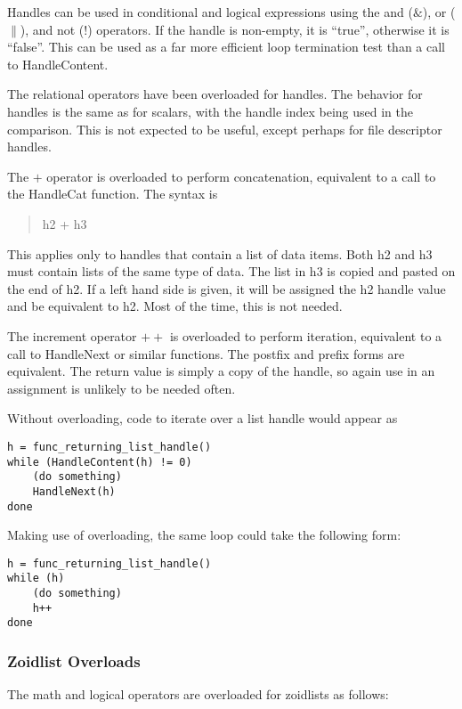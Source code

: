 Handles can be used in conditional and logical expressions using the
and ($\&$), or ($\|$), and not ($!$) operators.  If the handle is
non-empty, it is ``true'', otherwise it is ``false''.  This can be
used as a far more efficient loop termination test than a call to {\vt
HandleContent}.

The relational operators have been overloaded for handles.  The
behavior for handles is the same as for scalars, with the handle index
being used in the comparison.  This is not expected to be useful,
except perhaps for file descriptor handles.

The $+$ operator is overloaded to perform concatenation, equivalent to
a call to the {\vt HandleCat} function.  The syntax is
\begin{quote}
{\vt [h1 =] h2 + h3}
\end{quote}

This applies only to handles that contain a list of data items.  Both
{\vt h2} and {\vt h3} must contain lists of the same type of data. 
The list in {\vt h3} is copied and pasted on the end of {\vt h2}.  If
a left hand side is given, it will be assigned the {\vt h2} handle
value and be equivalent to {\vt h2}.  Most of the time, this is not
needed.

The increment operator $++$ is overloaded to perform iteration,
equivalent to a call to {\vt HandleNext} or similar functions.  The
postfix and prefix forms are equivalent.  The return value is simply a
copy of the handle, so again use in an assignment is unlikely to be
needed often.

Without overloading, code to iterate over a list handle would appear
as

\begin{verbatim}
h = func_returning_list_handle()
while (HandleContent(h) != 0)
    (do something)
    HandleNext(h)
done
\end{verbatim}

Making use of overloading, the same loop could take the following
form:

\begin{verbatim}
h = func_returning_list_handle()
while (h)
    (do something)
    h++
done
\end{verbatim}

\subsubsection{Zoidlist Overloads}

The math and logical operators are overloaded for zoidlists as follows:

